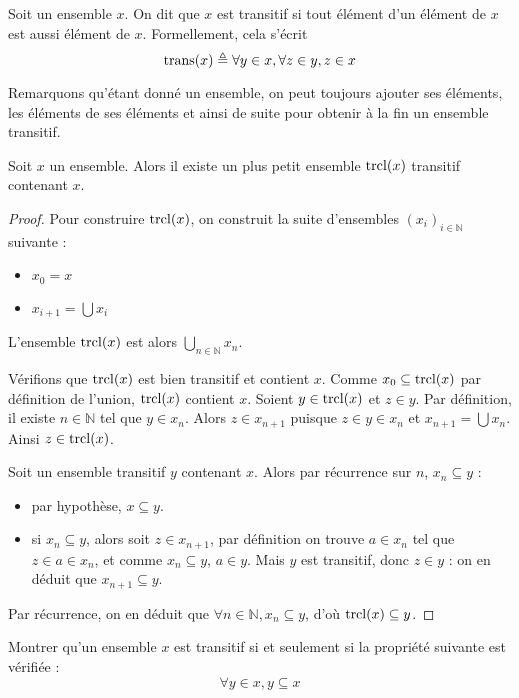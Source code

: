 \begin{definition}
  Soit un ensemble $x$. On dit que $x$ est transitif si tout élément d'un
  élément de $x$ est aussi élément de $x$. Formellement, cela s'écrit
  \[\operatorname{trans}(x) \triangleq \forall y\in x, \forall z \in y, z\in x\]
\end{definition}

Remarquons qu'étant donné un ensemble, on peut toujours ajouter ses éléments,
les éléments de ses éléments et ainsi de suite pour obtenir à la fin un ensemble
transitif.

\begin{proposition}
  Soit $x$ un ensemble. Alors il existe un plus petit ensemble $\operatorname{trcl}(x)$
  transitif contenant $x$.
\end{proposition}

\begin{proof}
  Pour construire $\operatorname{trcl}(x)$, on construit la suite d'ensembles
  $(x_i)_{i\in\mathbb N}$ suivante :
  \begin{itemize}
  \item $x_0 = x$
  \item $x_{i+1} = \bigcup x_i$
  \end{itemize}
  L'ensemble $\operatorname{trcl}(x)$ est alors $\displaystyle\bigcup_{n\in \mathbb N} x_n$.

  Vérifions que $\operatorname{trcl}(x)$ est bien transitif et contient $x$. Comme
  $x_0\subseteq \operatorname{trcl}(x)$ par définition de l'union, $\operatorname{trcl}(x)$ contient $x$.
  Soient $y\in \operatorname{trcl}(x)$ et $z\in y$. Par définition, il existe $n\in \mathbb N$
  tel que $y\in x_n$. Alors $z\in x_{n+1}$ puisque $z\in y \in x_n$ et
  $x_{n+1}=\bigcup x_n$. Ainsi $z\in \operatorname{trcl}(x)$.

  Soit un ensemble transitif $y$ contenant $x$. Alors par récurrence sur $n$,
  $x_n\subseteq y$ :
  \begin{itemize}
  \item par hypothèse, $x\subseteq y$.
  \item si $x_n\subseteq y$, alors soit $z\in x_{n+1}$, par définition on trouve
    $a\in x_n$ tel que $z\in a \in x_n$, et comme $x_n\subseteq y$, $a\in y$.
    Mais $y$ est transitif, donc $z\in y$ : on en déduit que
    $x_{n+1}\subseteq y$.
  \end{itemize}
  Par récurrence, on en déduit que $\forall n\in\mathbb N, x_n\subseteq y$,
  d'où $\operatorname{trcl}(x)\subseteq y$.
\end{proof}

\begin{exercise}
  Montrer qu'un ensemble $x$ est transitif si et seulement si la propriété
  suivante est vérifiée :
  \[\forall y\in x, y\subseteq x\]
\end{exercise}

